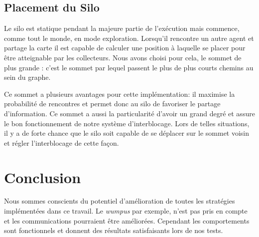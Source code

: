 \documentclass[11pt]{article}
\begin{document}
\subsection{Placement du Silo}

Le silo est statique pendant la majeure partie de l'exécution mais commence, comme tout le monde, en mode exploration. Lorsqu'il rencontre un autre agent et partage la carte il est capable de calculer une position à laquelle se placer pour être atteignable par les collecteurs. Nous avons choisi pour cela, le sommet de plus grande : c'est le sommet par lequel passent le plus de plus courts chemins au sein du graphe.

Ce sommet a plusieurs avantages pour cette implémentation: il maximise la probabilité de rencontres et permet donc au silo de favoriser le partage d'information. Ce sommet a aussi la particularité d'avoir un grand degré et assure le bon fonctionnement de notre système d'interblocage. Lors de telles situations, il y a de forte chance que le silo soit capable de se déplacer sur le sommet voisin et régler l'interblocage de cette façon.
\section{Conclusion}

Nous sommes conscients du potentiel d'amélioration de toutes les stratégies implémentées dans ce travail. Le \textit{wumpus} par exemple, n'est pas pris en compte et les communications pourraient être améliorées. Cependant les comportements sont fonctionnels et donnent des résultats satisfaisants lors de nos tests.
\end{document}
